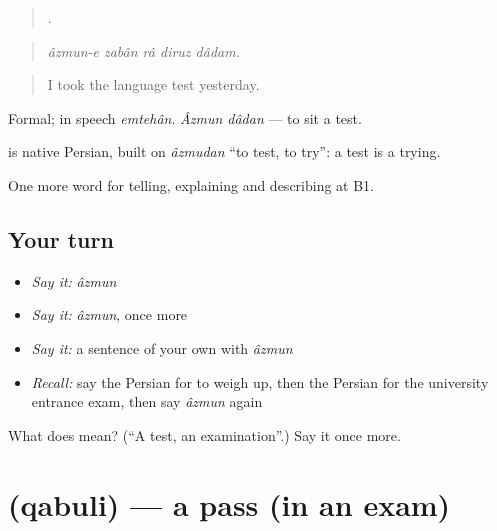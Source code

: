\begin{quote}
    .
\end{quote}

\begin{quote}
\emph{âzmun-e zabân râ diruz dâdam.}
\end{quote}

\begin{quote}
I took the language test yesterday.
\end{quote}

Formal; in speech \emph{emtehân}. \emph{Âzmun dâdan} — to sit a test.

\begin{cousinweb}
\textbf{} is native Persian, built on \emph{âzmudan} \textquotedblleft{}to test, to try\textquotedblright{}: a test is a trying.
\end{cousinweb}

\begin{grammarlens}[title={What you've built}]
One more word for telling, explaining and describing at B1.
\end{grammarlens}

\subsection*{Your turn}
\begin{itemize}
\raggedright
  \item \emph{Say it:} \emph{âzmun}
  \item \emph{Say it:} \emph{âzmun}, once more
  \item \emph{Say it:} a sentence of your own with \emph{âzmun}
  \item \emph{Recall:} say the Persian for to weigh up, then the Persian for the university entrance exam, then say \emph{âzmun} again
\end{itemize}

\begin{tcolorbox}[breakable,colback=teal!4,colframe=teal!35!black,title={Before you move on}]
What does  mean? (\textquotedblleft{}A test, an examination\textquotedblright{}.) Say it once more.
\end{tcolorbox}
\section[\texorpdfstring{\fa{قبولی} (qabuli)}{قبولی (qabuli)}]{ (qabuli) — a pass (in an exam)}

